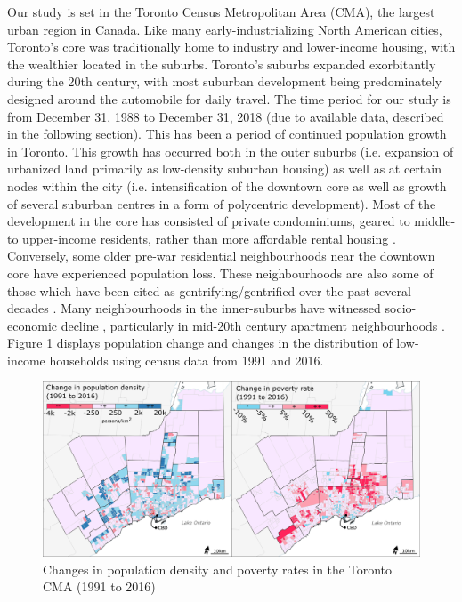 Our study is set in the Toronto Census Metropolitan Area (CMA), the largest urban region in Canada. Like many early-industrializing North American cities, Toronto's core was traditionally home to industry and lower-income housing, with the wealthier located in the suburbs. Toronto's suburbs expanded exorbitantly during the 20th century, with most suburban development being predominately designed around the automobile for daily travel. The time period for our study is from December 31, 1988 to December 31, 2018 (due to available data, described in the following section). This has been a period of continued population growth in Toronto. This growth has occurred both in the outer suburbs (i.e. expansion of urbanized land primarily as low-density suburban housing) as well as at certain nodes within the city (i.e. intensification of the downtown core as well as growth of several suburban centres in a form of polycentric development). Most of the development in the core has consisted of private condominiums, geared to middle- to upper-income residents, rather than more affordable rental housing \cite{rosen_castles_2015,walks_gentrification_2021}. Conversely, some older pre-war residential neighbourhoods near the downtown core have experienced population loss. These neighbourhoods are also some of those which have been cited as gentrifying/gentrified over the past several decades \cite{hulchanski_three_2010}. Many neighbourhoods in the inner-suburbs have witnessed socio-economic decline \cite{hulchanski_three_2010}, particularly in mid-20th century apartment neighbourhoods \cite{skaburskis_filtering_2014}. Figure \ref{fig:studyareamap} displays population change and changes in the distribution of low-income households using census data from 1991 and 2016.

\begin{figure}[h]
	\centering
	\includegraphics[width=1\linewidth]{figures/study_area_map.png}
	\caption{{Changes in population density and poverty rates in the Toronto CMA (1991 to 2016)}}
	\label{fig:studyareamap}
\end{figure}


